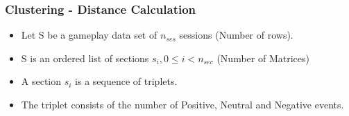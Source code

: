 \documentclass[xcolor=table]{beamer}
\begin{document}
\begin{frame}
\frametitle{Clustering - Distance Calculation}

\begin{minipage}[t][0.15\textheight][t]{\textwidth}
\end{minipage}
\begin{minipage}[t][0.85\textheight][t]{\textwidth}
\begin{itemize}
\item Let S be a gameplay data set of $n_{ses}$ sessions (Number of rows).
\item S is an ordered list of sections $s_i, 0 \le i < n_{sec}$ (Number of Matrices)
\item A section $s_i$ is a sequence of triplets.
\item The triplet consists of the number of Positive, Neutral and Negative events.
\end{itemize}
\end{minipage}
\end{frame}
\end{document}
